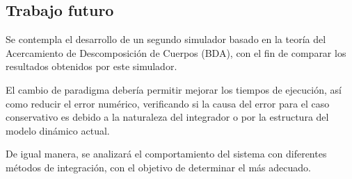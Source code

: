 \subsection{Trabajo futuro}
    Se contempla el desarrollo de un segundo simulador basado en 
    la teoría del Acercamiento de Descomposición de Cuerpos (BDA), con el 
    fin de comparar los resultados obtenidos por este simulador.
    
    El cambio de paradigma debería permitir mejorar los tiempos de ejecución, así 
    como reducir el error numérico, verificando si la causa del error para el caso 
    conservativo es debido a la naturaleza del integrador o por la estructura del 
    modelo dinámico actual.

    De igual manera, se analizará el comportamiento del sistema con diferentes métodos 
    de integración, con el objetivo de determinar el más adecuado. 



